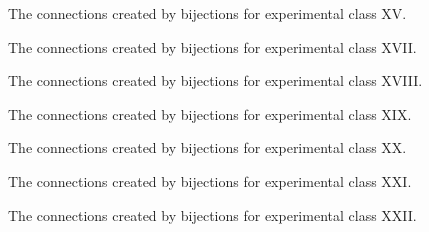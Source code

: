 \begin{figure}[ht!]
    \centering
    
    \caption{The connections created by bijections for experimental class XV.}
    \label{fig:expgrp_XV}
\end{figure}


\begin{comment}
\begin{figure}[ht!]
    \centering
    
    \caption{The connections created by bijections for experimental class XVI.}
    \label{fig:expgrp_XVI}
\end{figure}
\end{comment}


\begin{figure}[ht!]
    \centering
    
    \caption{The connections created by bijections for experimental class XVII.}
    \label{fig:expgrp_XVII}
\end{figure}


\begin{figure}[ht!]
    \centering
    
    \caption{The connections created by bijections for experimental class XVIII.}
    \label{fig:expgrp_XVIII}
\end{figure}


\begin{figure}[ht!]
    \centering
    
    \caption{The connections created by bijections for experimental class XIX.}
    \label{fig:expgrp_XIX}
\end{figure}


\begin{figure}[ht!]
    \centering
    
    \caption{The connections created by bijections for experimental class XX.}
    \label{fig:expgrp_XX}
\end{figure}

\begin{figure}[ht!]
    \centering
    
    \caption{The connections created by bijections for experimental class XXI.}
    \label{fig:expgrp_XXI}
\end{figure}


\begin{figure}[ht!]
    \centering
    
    \caption{The connections created by bijections for experimental class XXII.}
    \label{fig:expgrp_XXII}
\end{figure}


